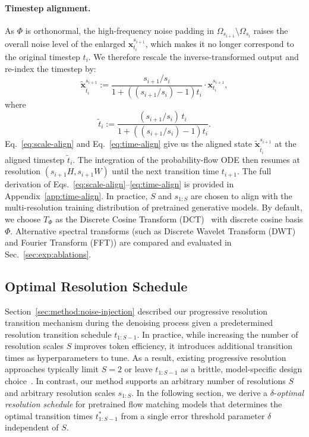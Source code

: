 \paragraph{Timestep alignment.}
As $\Phi$ is orthonormal, the high-frequency noise padding in $\Omega_{s_{i + 1}} \setminus \Omega_{s_i}$ raises the overall noise level of the enlarged $\mathbf{x}_{t_i}^{{s_{i+1}}}$, which makes it no longer correspond to the original timestep $t_i$. We therefore rescale the inverse-transformed output and re-index the timestep by:
\begin{equation}
  \tilde{\mathbf{x}}^{s_{i+1}}_{\tilde{t}_i} := \frac{s_{i+1}/s_i}{1 + ((s_{i+1}/s_i) - 1)t_i} \cdot \mathbf{x}^{s_{i+1}}_{t_i},
  \label{eq:scale-align}
\end{equation}
where
\begin{equation}
  \tilde{t}_i := \frac{(s_{i+1}/s_i)\,t_i}{1 + ((s_{i+1}/s_i) - 1)t_i}.
  \label{eq:time-align}
\end{equation}
Eq.~\ref{eq:scale-align} and Eq.~\ref{eq:time-align} give us the aligned state $\tilde{\mathbf{x}}^{s_{i+1}}_{\tilde{t}_i}$ at the aligned timestep $\tilde{t}_i$. The integration of the probability-flow ODE then resumes at resolution $(s_{i+1}H, s_{i+1}W)$ until the next transition time $t_{i+1}$. 
The full derivation of Eqs.~\eqref{eq:scale-align}--\eqref{eq:time-align} is provided in Appendix~\ref{app:time-align}. In practice, $S$ and $s_{1:S}$ are chosen to align with the multi-resolution training distribution of pretrained generative models. By default, we choose $T_\Phi$ as the Discrete Cosine Transform (DCT)~\citep{ahmed1974dct} with discrete cosine basis $\Phi$. Alternative spectral transforms (such as Discrete Wavelet Transform (DWT) and Fourier Transform (FFT)) are compared and evaluated in Sec.~\ref{sec:exp:ablations}.





\subsection{Optimal Resolution Schedule}

\label{sec:method:schedule:signal}

Section~\ref{sec:method:noise-injection} described our progressive resolution transition mechanism during the denoising process given a predetermined resolution transition schedule $t_{1:S-1}$. In practice, while increasing the number of resolution scales $S$ improves token efficiency, it introduces additional transition times as hyperparameters to tune. As a result, existing progressive resolution approaches typically limit $S = 2$ or leave $t_{1:S-1}$ as a brittle, model-specific design choice~\citep{bottleneck, ralu}. 
In contrast, our method supports an arbitrary number of resolutions $S$ and arbitrary resolution scales $s_{1:S}$. In the following section, we derive a $\delta$-\textit{optimal resolution schedule} for pretrained flow matching models that determines the optimal transition times $t^*_{1:S-1}$ from a single error threshold parameter $\delta$ independent of $S$.


